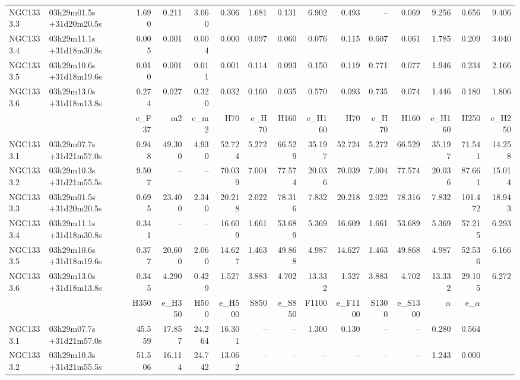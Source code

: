 \begin{landscape}
\begin{table}[!h]
\begin{longtable}{llrrrrrrrrrrrrr}
NGC1333.3	&	03h29m01.5s	+31d20m20.5s	&	1.690	&	0.211	&	3.060	&	0.306	&	1.681	&	0.131	&	6.902	&	0.493	&	--	&	0.069	&	9.256	&	0.656	&	9.406	\\
NGC1333.4	&	03h29m11.1s	+31d18m30.8s	&	0.005	&	0.001	&	0.004	&	0.000	&	0.097	&	0.060	&	0.076	&	0.115	&	0.607	&	0.061	&	1.785	&	0.209	&	3.040	\\
NGC1333.5	&	03h29m10.6s	+31d18m19.6s	&	0.010	&	0.001	&	0.011	&	0.001	&	0.114	&	0.093	&	0.150	&	0.119	&	0.771	&	0.077	&	1.946	&	0.234	&	2.166	\\
NGC1333.6	&	03h29m13.0s	+31d18m13.8s	&	0.274	&	0.027	&	0.320	&	0.032	&	0.160	&	0.035	&	0.570	&	0.093	&	0.735	&	0.074	&	1.446	&	0.180	&	1.806	\\
\midrule																														
	&			&	e\_F37	&	m2	&	e\_m2	&	H70	&	e\_H70	&	H160	&	e\_H160	&	H70	&	e\_H70	&	H160	&	e\_H160	&	H250	&	e\_H250	\\
\midrule																														
NGC1333.1	&	03h29m07.7s	+31d21m57.0s	&	0.948	&	49.300	&	4.930	&	52.724	&	5.272	&	66.529	&	35.197	&	52.724	&	5.272	&	66.529	&	35.197	&	71.541	&	14.258	\\
NGC1333.2	&	03h29m10.3s	+31d21m55.5s	&	9.507	&	--	&	--	&	70.039	&	7.004	&	77.574	&	20.036	&	70.039	&	7.004	&	77.574	&	20.036	&	87.661	&	15.014	\\
NGC1333.3	&	03h29m01.5s	+31d20m20.5s	&	0.695	&	23.400	&	2.340	&	20.218	&	2.022	&	78.316	&	7.832	&	20.218	&	2.022	&	78.316	&	7.832	&	101.472	&	18.943	\\
NGC1333.4	&	03h29m11.1s	+31d18m30.8s	&	0.341	&	--	&	--	&	16.609	&	1.661	&	53.689	&	5.369	&	16.609	&	1.661	&	53.689	&	5.369	&	57.215	&	6.293	\\
NGC1333.5	&	03h29m10.6s	+31d18m19.6s	&	0.377	&	20.600	&	2.060	&	14.627	&	1.463	&	49.868	&	4.987	&	14.627	&	1.463	&	49.868	&	4.987	&	52.536	&	6.166	\\
NGC1333.6	&	03h29m13.0s	+31d18m13.8s	&	0.345	&	4.290	&	0.429	&	1.527	&	3.883	&	4.702	&	13.332	&	1.527	&	3.883	&	4.702	&	13.332	&	29.105	&	6.272	\\
\midrule																														
	&			&	H350	&	e\_H350	&	H500	&	e\_H500	&	S850	&	e\_S850	&	F1100	&	e\_F1100	&	S1300	&	e\_S1300	&	$\alpha$	&	e\_$\alpha$	&		\\
\midrule																														
NGC1333.1	&	03h29m07.7s	+31d21m57.0s	&	45.559	&	17.857	&	24.264	&	16.301	&	--	&	--	&	1.300	&	0.130	&	--	&	--	&	0.280	&	0.564	&		\\
NGC1333.2	&	03h29m10.3s	+31d21m55.5s	&	51.506	&	16.114	&	24.742	&	13.062	&	--	&	--	&	--	&	--	&	--	&	--	&	1.243	&	0.000	&		\\

\end{longtable}
\end{table}
\end{landscape}
